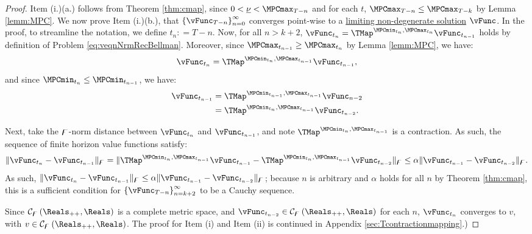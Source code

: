 \documentclass[\econtexRoot/BufferStockTheory]{subfiles}
\begin{document}
\begin{proof}

Item (i.)(a.) follows from Theorem \ref{thm:cmap}, since $0<\MPCminInf<\MPCmax_{T-n}$ and for each $t$, $\MPCmax_{T-n}\leq \MPCmax_{T-k}$ by Lemma \ref{lemm:MPC}.
We now prove Item (i.)(b.), that $\left\{\vFunc_{T-n}\right\}_{n=0}^{\infty}$ converges point-wise to a \hyperref[def:nondegeneracy]{limiting non-degenerate solution} $\vFunc$.
In the proof, to streamline the notation, we define $t_{n}\colon = T - n$.
Now, for all $n>k+2$, $\vFunc_{t_{n}} = \TMap^{\MPCmin_{t_{n}}, \MPCmax_{t_{n}}}\vFunc_{t_{n-1}}$ holds by definition of Problem \eqref{eq:veqnNrmRecBellman}.
Moreover, since $\MPCmax_{t_{n-1}}\geq \MPCmax_{t_{n}}$ by Lemma \ref{lemm:MPC}, we have:
%
\begin{equation*}
\vFunc_{t_{n}} = \TMap^{\MPCmin_{t_{n}}, \MPCmax_{t_{n-1}}}\vFunc_{t_{n-1}}, 
\end{equation*}
%
and since $\MPCmin_{t_{n}}\leq \MPCmin_{t_{n-1}}$, we have:
%
\begin{equation}\begin{gathered}\begin{aligned}
\vFunc_{t_{n-1}} &  = \TMap^{\MPCmin_{t_{n-1}}, \MPCmax_{t_{n-1}}}\vFunc_{n-2}\\ &  = \TMap^{\MPCmin_{t_{n}}, \MPCmax_{t_{n-1}}}\vFunc_{t_{n-2}}. 
\end{aligned}\end{gathered}\end{equation}

Next, take the $\digamma$-norm distance between $\vFunc_{t_{n}}$ and $\vFunc_{t_{n-1}}$, and note  $\TMap^{\MPCmin_{t_{n}}, \MPCmax_{t_{n-1}}}$ is a contraction.
As such, the sequence of finite horizon value functions satisfy:
%
\begin{equation*}
\Vert\vFunc_{t_{n}} - \vFunc_{t_{n-1}}\Vert_{\boundFunc} = \Vert\TMap^{\MPCmin_{t_{n}}, \MPCmax_{t_{n-1}}}\vFunc_{t_{n-1}} - \TMap^{\MPCmin_{t_{n}}, \MPCmax_{t_{n-1}}}\vFunc_{t_{n-2}}\Vert_{\boundFunc} \leq \Shrinker \Vert \vFunc_{t_{n-1}} - \vFunc_{t_{n-2}}\Vert_{\boundFunc}. 
\end{equation*}
%
As such, $\Vert \vFunc_{t_{n}} - \vFunc_{t_{n-1}}\Vert_{\boundFunc } \leq \Shrinker \Vert \vFunc_{t_{n-1}} - \vFunc_{t_{n-2}}\Vert_{\boundFunc } $; because $n$ is arbitrary and $\alpha$ holds for all $n$ by Theorem \ref{thm:cmap}, this is a sufficient condition for  $\left\{\vFunc_{T-n}\right\}_{n=k+2}^{\infty}$ to be a Cauchy sequence.

Since $\mathcal{C}_{\boundFunc }\left(\Reals_{++},\Reals\right) $ is a complete metric space, and $\vFunc_{t_{n-2}} \in \mathcal{C}_{\boundFunc }\left(\Reals_{++},\Reals\right)$ for each $n$, $\vFunc_{t_{n}}$ converges to $v$, with $v\in \mathcal{C}_{\boundFunc }\left(\Reals_{++},\Reals\right)$.
The proof for Item (i) and Item (ii) is continued in Appendix \ref{sec:Tcontractionmapping}.)
\end{proof}
\end{document}

